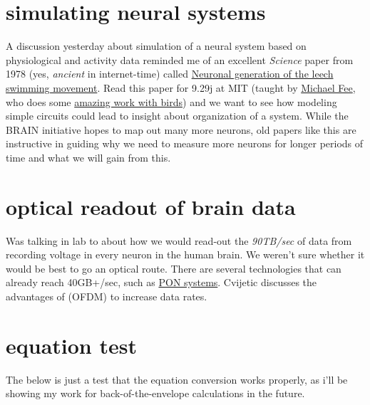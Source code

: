 	\section{simulating neural systems} %
	\label{sub:simulating_neural_systems}


		A discussion yesterday about simulation of a neural system based on physiological and activity data reminded me of an excellent \emph{Science} paper from 1978 (yes, \emph{ancient} in internet-time) called \href{http://www.sciencemag.org/content/200/4348/1348.short}{Neuronal generation of the leech swimming movement}.\citep{stent1978neuronal} Read this paper for 9.29j at MIT (taught by \href{http://web.mit.edu/feelab/}{Michael Fee}, who does some \href{http://www.nature.com/nature/journal/v456/n7219/abs/nature07448.html}{amazing work with birds}) and we want to see how modeling simple circuits could lead to insight about organization of a system. While the BRAIN initiative hopes to map out many more neurons, old papers like this are instructive in guiding why we need to measure more neurons for longer periods of time and what we will gain from this.

	\section{optical readout of brain data}
		Was talking in lab to  about how we would read-out the \emph{90TB/sec} of data from recording voltage in every neuron in the human brain. We weren't sure whether it would be best to go an optical route. There are several technologies that can already reach 40GB+/sec, such as \href{http://en.wikipedia.org/wiki/Passive_optical_network}{PON systems}. Cvijetic discusses the advantages of  (OFDM) to increase data rates.\citep{cvijetic2012ofdm}

	\section{equation test}
		The below is just a test that the equation conversion works properly, as i'll be showing my work for back-of-the-envelope calculations in the future.

